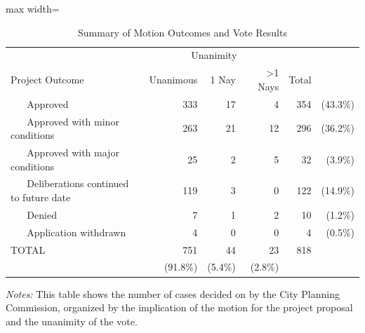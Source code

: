 
\begin{table}[H]
\caption{Summary of Motion Outcomes and Vote Results}
\vspace{0.2cm}
\label{tab_result_unanimity}
\begin{adjustbox}{max width=\textwidth}
\begin{threeparttable}
\begin{tabular}{lrrrrr} \toprule
 & \multicolumn{3}{c}{Unanimity} & & \\
 Project Outcome & Unanimous & 1 Nay & >1 Nays & Total &  \\ \midrule
  ~ ~ Approved & 333 & 17 & 4 & 354 & (43.3\%) \\ [1ex]
 ~ ~ Approved with minor conditions & 263 & 21 & 12 & 296 & (36.2\%) \\ [1ex]
 ~ ~ Approved with major conditions & 25 & 2 & 5 & 32 & (3.9\%) \\ [1ex]
 ~ ~ Deliberations continued to future date & 119 & 3 & 0 & 122 & (14.9\%) \\ [1ex]
 ~ ~ Denied & 7 & 1 & 2 & 10 & (1.2\%) \\ [1ex]
 ~ ~ Application withdrawn & 4 & 0 & 0 & 4 & (0.5\%) \\ [1ex]
TOTAL & 751 & 44 & 23 & 818 & \\ [1ex]
 & (91.8\%) & (5.4\%) & (2.8\%) & & \\ [1ex] 
\bottomrule
\end{tabular}
\begin{tablenotes}
\item {\textit{Notes: } This table shows the number of cases decided on by the City Planning Commission, organized by the implication of the motion for the project proposal and the unanimity of the vote.}
\end{tablenotes}
\end{threeparttable}
\end{adjustbox}
\end{table}
